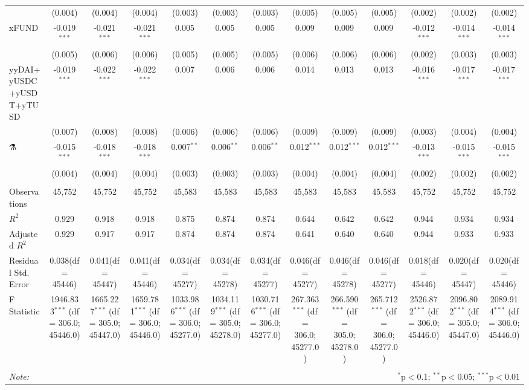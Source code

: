 \begin{table}[!htbp]
\begin{tabular}{@{\extracolsep{5pt}}lcccccccccccc}
  & (0.004) & (0.004) & (0.004) & (0.003) & (0.003) & (0.003) & (0.005) & (0.005) & (0.005) & (0.002) & (0.002) & (0.002) \\
 xFUND & -0.019$^{***}$ & -0.021$^{***}$ & -0.021$^{***}$ & 0.005$^{}$ & 0.005$^{}$ & 0.005$^{}$ & 0.009$^{}$ & 0.009$^{}$ & 0.009$^{}$ & -0.012$^{***}$ & -0.014$^{***}$ & -0.014$^{***}$ \\
  & (0.005) & (0.006) & (0.006) & (0.005) & (0.005) & (0.005) & (0.006) & (0.006) & (0.006) & (0.002) & (0.003) & (0.003) \\
 yyDAI+yUSDC+yUSDT+yTUSD & -0.019$^{***}$ & -0.022$^{***}$ & -0.022$^{***}$ & 0.007$^{}$ & 0.006$^{}$ & 0.006$^{}$ & 0.014$^{}$ & 0.013$^{}$ & 0.013$^{}$ & -0.016$^{***}$ & -0.017$^{***}$ & -0.017$^{***}$ \\
  & (0.007) & (0.008) & (0.008) & (0.006) & (0.006) & (0.006) & (0.009) & (0.009) & (0.009) & (0.003) & (0.004) & (0.004) \\
 ⚗️ & -0.015$^{***}$ & -0.018$^{***}$ & -0.018$^{***}$ & 0.007$^{**}$ & 0.006$^{**}$ & 0.006$^{**}$ & 0.012$^{***}$ & 0.012$^{***}$ & 0.012$^{***}$ & -0.013$^{***}$ & -0.015$^{***}$ & -0.015$^{***}$ \\
  & (0.004) & (0.004) & (0.004) & (0.003) & (0.003) & (0.003) & (0.004) & (0.004) & (0.004) & (0.002) & (0.002) & (0.002) \\
\hline \\[-1.8ex]
 Observations & 45,752 & 45,752 & 45,752 & 45,583 & 45,583 & 45,583 & 45,583 & 45,583 & 45,583 & 45,752 & 45,752 & 45,752 \\
 $R^2$ & 0.929 & 0.918 & 0.918 & 0.875 & 0.874 & 0.874 & 0.644 & 0.642 & 0.642 & 0.944 & 0.934 & 0.934 \\
 Adjusted $R^2$ & 0.929 & 0.917 & 0.917 & 0.874 & 0.874 & 0.874 & 0.641 & 0.640 & 0.640 & 0.944 & 0.933 & 0.933 \\
 Residual Std. Error & 0.038(df = 45446) & 0.041(df = 45447) & 0.041(df = 45446) & 0.034(df = 45277) & 0.034(df = 45278) & 0.034(df = 45277) & 0.046(df = 45277) & 0.046(df = 45278) & 0.046(df = 45277) & 0.018(df = 45446) & 0.020(df = 45447) & 0.020(df = 45446)  \\
 F Statistic & 1946.833$^{***}$ (df = 306.0; 45446.0) & 1665.227$^{***}$ (df = 305.0; 45447.0) & 1659.781$^{***}$ (df = 306.0; 45446.0) & 1033.986$^{***}$ (df = 306.0; 45277.0) & 1034.119$^{***}$ (df = 305.0; 45278.0) & 1030.716$^{***}$ (df = 306.0; 45277.0) & 267.363$^{***}$ (df = 306.0; 45277.0) & 266.590$^{***}$ (df = 305.0; 45278.0) & 265.712$^{***}$ (df = 306.0; 45277.0) & 2526.872$^{***}$ (df = 306.0; 45446.0) & 2096.802$^{***}$ (df = 305.0; 45447.0) & 2089.914$^{***}$ (df = 306.0; 45446.0) \\
\hline
\hline \\[-1.8ex]
\textit{Note:} & \multicolumn{12}{r}{$^{*}$p$<$0.1; $^{**}$p$<$0.05; $^{***}$p$<$0.01} \\
\end{tabular}
\end{table}
